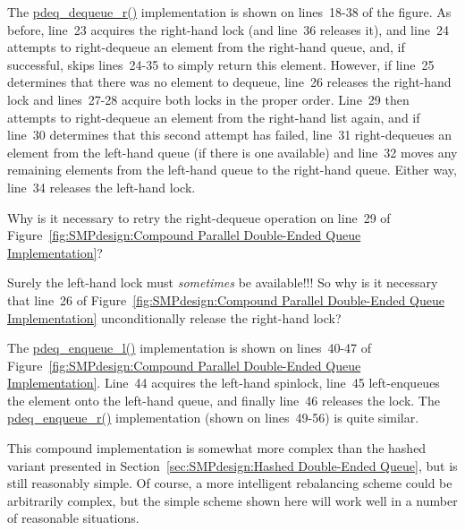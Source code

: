 The \url{pdeq_dequeue_r()} implementation is shown on lines~18-38
of the figure.
As before, line~23 acquires the right-hand lock (and line~36
releases it), and line~24 attempts to right-dequeue an element
from the right-hand queue, and, if successful, skips lines~24-35
to simply return this element.
However, if line~25 determines that there was no element to dequeue,
line~26 releases the right-hand lock and lines~27-28 acquire both
locks in the proper order.
Line~29 then attempts to right-dequeue an element from the right-hand
list again, and if line~30 determines that this second attempt has
failed, line~31 right-dequeues an element from the left-hand queue
(if there is one available) and line~32 moves any remaining elements
from the left-hand queue to the right-hand queue.
Either way, line~34 releases the left-hand lock.

\QuickQuiz{}
	Why is it necessary to retry the right-dequeue operation
	on line~29 of
	Figure~\ref{fig:SMPdesign:Compound Parallel Double-Ended Queue Implementation}?
 \QuickQuizEnd

\QuickQuiz{}
	Surely the left-hand lock must \emph{sometimes} be available!!!
	So why is it necessary that line~26 of
	Figure~\ref{fig:SMPdesign:Compound Parallel Double-Ended Queue Implementation}
	unconditionally release the right-hand lock?
 \QuickQuizEnd

The \url{pdeq_enqueue_l()} implementation is shown on lines~40-47 of
Figure~\ref{fig:SMPdesign:Compound Parallel Double-Ended Queue Implementation}.
Line~44 acquires the left-hand spinlock, line~45 left-enqueues the
element onto the left-hand queue, and finally line~46 releases
the lock.
The \url{pdeq_enqueue_r()} implementation (shown on lines~49-56)
is quite similar.

This compound implementation is somewhat more complex than the
hashed variant presented in
Section~\ref{sec:SMPdesign:Hashed Double-Ended Queue},
but is still reasonably simple.
Of course, a more intelligent rebalancing scheme could be arbitrarily
complex, but the simple scheme shown here will work well in a number
of reasonable situations.

